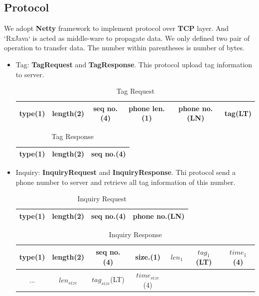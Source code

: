 \documentclass{article}
\begin{document}
\subsection{Protocol}
We adopt \textbf{Netty} \cite{netty} framework to implement protocol over \textbf{TCP} layer. And `RxJava` is acted as middle-ware to propagate data. We only defined two pair of operation to transfer data. The number within parentheses is number of bytes.

\begin{itemize}
    
    \item Tag: \textbf{TagRequest} and \textbf{TagResponse}. This protocol upload tag information to server.

    \begin{table}[!hbp]
        \centering
        \begin{tabular}{|c|c|c|c|c|c|}
        \hline
        type(1) & length(2) & seq no.(4) & phone len.(1) & phone no.(LN) & tag(LT)\\
        \hline
        \end{tabular}
        \caption{Tag Request}
    \end{table} 

    \begin{table}[!hbp]
        \centering
        \begin{tabular}{|c|c|c|}
        \hline
        type(1) & length(2) & seq no.(4)\\
        \hline
        \end{tabular}
        \caption{Tag Response}
    \end{table} 

    \item Inquiry: \textbf{InquiryRequest} and \textbf{InquiryResponse}. Thi protocol send a phone number to server and retrieve all tag information of this number.

    \begin{table}[!hbp]
        \centering
        \begin{tabular}{|c|c|c|c|}
        \hline
        type(1) & length(2) & seq no.(4) & phone no.(LN)\\
        \hline
        \end{tabular}
        \caption{Inquiry Request}
    \end{table} 

    \begin{table}[!hbp]
        \centering
        \begin{tabular}{|c|c|c|c|c|c|c|}
        \hline
        type(1) & length(2) & seq no.(4) & size.(1) & $len_1$ & $tag_1$(LT) & $time_1$(4)  \\
        \hline
         ... & $len_{size}$ & $tag_{size}$(LT) & $time_{size}$(4) & & &\\
        \hline
        \end{tabular}
        \caption{Inquiry Response}
    \end{table} 

\end{itemize}
\end{document}
